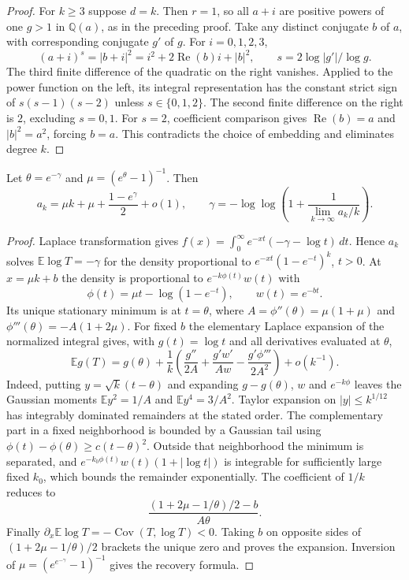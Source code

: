 \documentclass[11pt,a4paper]{article}
\theoremstyle{definition}\newtheorem{definition}[theorem]{Definition}\newtheorem{example}[theorem]{Example}
\theoremstyle{remark}\newtheorem{remark}[theorem]{Remark}
\newcommand{\Q}{\mathbb Q}\newcommand{\Z}{\mathbb Z}\newcommand{\R}{\mathbb R}\newcommand{\N}{\mathbb N}
\begin{document}
\begin{proof}
For $k\ge3$ suppose $d=k$. Then $r=1$, so all $a+i$ are positive powers of one $g>1$ in $\Q(a)$, as in the preceding proof. Take any distinct conjugate $b$ of $a$, with corresponding conjugate $g'$ of $g$. For $i=0,1,2,3$,
\[
 (a+i)^s=|b+i|^2=i^2+2\operatorname{Re}(b)i+|b|^2,
 \qquad s=2\log|g'|/\log g.
\]
The third finite difference of the quadratic on the right vanishes. Applied to the power function on the left, its integral representation has the constant strict sign of $s(s-1)(s-2)$ unless $s\in\{0,1,2\}$. The second finite difference on the right is $2$, excluding $s=0,1$. For $s=2$, coefficient comparison gives $\operatorname{Re}(b)=a$ and $|b|^2=a^2$, forcing $b=a$. This contradicts the choice of embedding and eliminates degree $k$.
\end{proof}
\begin{corollary}\label{cor:fd-asymptotic}
Let $\theta=e^{-\gamma}$ and $\mu=(e^\theta-1)^{-1}$. Then
\[
 a_k=\mu k+\mu+\frac{1-e^\gamma}{2}+o(1),\qquad
 \gamma=-\log\log\left(1+\frac{1}{\lim_{k\to\infty}a_k/k}\right).
\]
\end{corollary}
\begin{proof}
Laplace transformation gives $f(x)=\int_0^\infty e^{-xt}(-\gamma-\log t)\,dt$. Hence $a_k$ solves $\mathbb E\log T=-\gamma$ for the density proportional to $e^{-xt}(1-e^{-t})^k$, $t>0$. At $x=\mu k+b$ the density is proportional to $e^{-k\phi(t)}w(t)$ with
\[
 \phi(t)=\mu t-\log(1-e^{-t}),\qquad w(t)=e^{-bt}.
\]
Its unique stationary minimum is at $t=\theta$, where $A=\phi''(\theta)=\mu(1+\mu)$ and $\phi'''(\theta)=-A(1+2\mu)$. For fixed $b$ the elementary Laplace expansion of the normalized integral gives, with $g(t)=\log t$ and all derivatives evaluated at $\theta$,
\[
 \mathbb E g(T)=g(\theta)+\frac1k\left(\frac{g''}{2A}
 +\frac{g'w'}{Aw}-\frac{g'\phi'''}{2A^2}\right)+o(k^{-1}).
\]
Indeed, putting $y=\sqrt{k}(t-\theta)$ and expanding $g-g(\theta)$, $w$ and $e^{-k\phi}$ leaves the Gaussian moments $\mathbb E y^2=1/A$ and $\mathbb E y^4=3/A^2$. Taylor expansion on $|y|\le k^{1/12}$ has integrably dominated remainders at the stated order. The complementary part in a fixed neighborhood is bounded by a Gaussian tail using $\phi(t)-\phi(\theta)\ge c(t-\theta)^2$. Outside that neighborhood the minimum is separated, and $e^{-k_0\phi(t)}w(t)(1+|\log t|)$ is integrable for sufficiently large fixed $k_0$, which bounds the remainder exponentially. The coefficient of $1/k$ reduces to
\[
 \frac{(1+2\mu-1/\theta)/2-b}{A\theta}.
\]
Finally $\partial_x\mathbb E\log T=-\operatorname{Cov}(T,\log T)<0$. Taking $b$ on opposite sides of $(1+2\mu-1/\theta)/2$ brackets the unique zero and proves the expansion. Inversion of $\mu=(e^{e^{-\gamma}}-1)^{-1}$ gives the recovery formula.
\end{proof}
\end{document}
